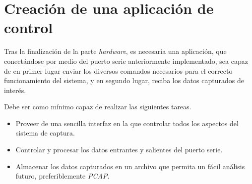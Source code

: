 


\section{Creación de una aplicación de control}
Tras la finalización de la parte \emph{hardware}, es necesaria una aplicación, que conectándose por medio del puerto serie anteriormente implementado, sea capaz de en primer lugar enviar los diversos comandos necesarios para el correcto funcionamiento del sistema, y en segundo lugar, reciba los datos capturados de interés.

Debe ser como mínimo capaz de realizar las siguientes tareas.
\begin{itemize}
    \item Proveer de una sencilla interfaz en la que controlar todos los aspectos del sistema de captura.
    \item Controlar y procesar los datos entrantes y salientes del puerto serie.
    \item Almacenar los datos capturados en un archivo que permita un fácil análisis futuro, preferiblemente \emph{PCAP}\cite{tcpdump:pcap}.
\end{itemize}






